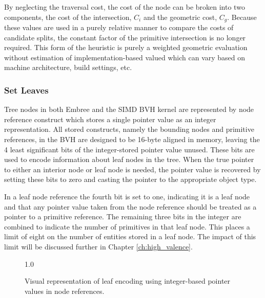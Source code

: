 By neglecting the traversal cost, the cost of the node can be broken into two
components, the cost of the intersection, $C_{i}$ and the geometric cost,
$C_{g}$. Because these values are used in a purely relative manner to compare
the costs of candidate splits, the constant factor of the primitive intersection
is no longer required. This form of the heuristic is purely a weighted geometric
evaluation without estimation of implementation-based valued which can vary
based on machine architecture, build settings, etc.

\subsubsection{Set Leaves}

Tree nodes in both Embree and the SIMD BVH kernel are represented by node
reference construct which stores a single pointer value as an integer
representation. All stored constructs, namely the bounding nodes and primitive
references, in the BVH are designed to be 16-byte aligned in memory, leaving the
4 least significant bits of the integer-stored pointer value unused. These bits
are used to encode information about leaf nodes in the tree. When the true
pointer to either an interior node or leaf node is needed, the pointer value is
recovered by setting these bits to zero and casting the pointer to the
appropriate object type.

In a leaf node reference the fourth bit is set to one, indicating it is a leaf
node and that any pointer value taken from the node reference should be treated
as a pointer to a primitive reference. The remaining three bits in the integer are
combined to indicate the number of primitives in that leaf node. This places a
limit of eight on the number of entities stored in a leaf node. The impact of
this limit will be discussed further in Chapter \ref{ch:high_valence}.

\begin{figure}[H]
  \centering
  {1.0\textwidth}
  \caption{Visual representation of leaf encoding using integer-based
    pointer values in node references.}
  \label{fig:leaf_encoding}
\end{figure}

